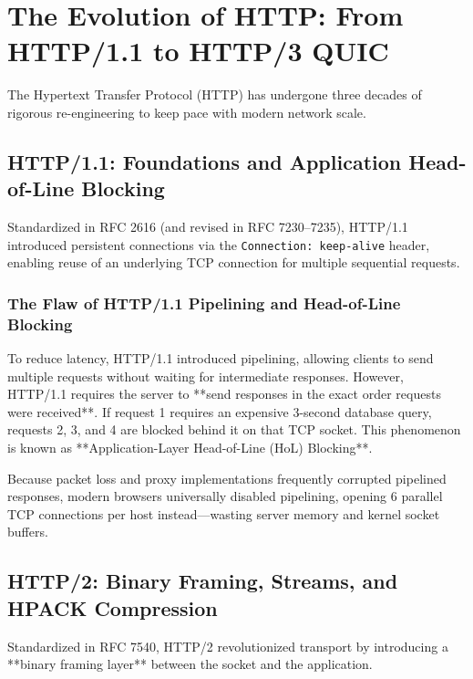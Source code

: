 \section{The Evolution of HTTP: From HTTP/1.1 to HTTP/3 QUIC}

The Hypertext Transfer Protocol (HTTP) has undergone three decades of rigorous re-engineering to keep pace with modern network scale.

\subsection{HTTP/1.1: Foundations and Application Head-of-Line Blocking}

Standardized in RFC 2616 (and revised in RFC 7230--7235), HTTP/1.1 introduced persistent connections via the \texttt{Connection: keep-alive} header, enabling reuse of an underlying TCP connection for multiple sequential requests.

\subsubsection{The Flaw of HTTP/1.1 Pipelining and Head-of-Line Blocking}
To reduce latency, HTTP/1.1 introduced pipelining, allowing clients to send multiple requests without waiting for intermediate responses. However, HTTP/1.1 requires the server to **send responses in the exact order requests were received**. If request 1 requires an expensive 3-second database query, requests 2, 3, and 4 are blocked behind it on that TCP socket. This phenomenon is known as **Application-Layer Head-of-Line (HoL) Blocking**. 

Because packet loss and proxy implementations frequently corrupted pipelined responses, modern browsers universally disabled pipelining, opening 6 parallel TCP connections per host instead—wasting server memory and kernel socket buffers.

\subsection{HTTP/2: Binary Framing, Streams, and HPACK Compression}

Standardized in RFC 7540, HTTP/2 revolutionized transport by introducing a **binary framing layer** between the socket and the application.

